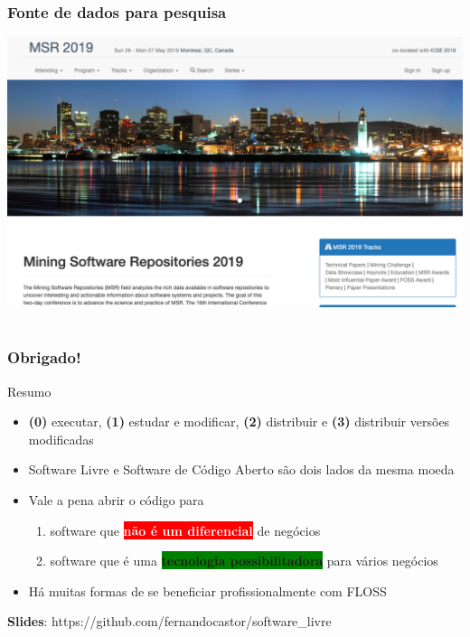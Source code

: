 \documentclass[xcolor=dvipsnames]{beamer}
\newcommand{\bred}[1]{\colorbox{red}{\textcolor{white}{#1}}}
\newcommand{\bgreen}[1]{\colorbox{green}{#1}}
\begin{document}
\begin{frame}
	\frametitle{Fonte de dados para pesquisa}
 	\includegraphics[scale=0.24]{msr.png}
\end{frame}


\section{}

\begin{frame}
	\frametitle{Obrigado!}
\begin{block}{Resumo}
\begin{itemize}
\item {\bf (0)} executar, {\bf (1)} estudar e modificar, {\bf (2)} distribuir e {\bf (3)} distribuir versões modificadas
\item Software Livre e Software de Código Aberto são dois lados da mesma moeda 
\item Vale a pena abrir o código para\vspace{0.1cm}
	\begin{enumerate}
	\item software que \bred{\textbf{não é um diferencial}} de negócios
	\item software que é uma \bgreen{\textbf{tecnologia possibilitadora}} para vários negócios
	\end{enumerate}
\item Há muitas formas de se beneficiar profissionalmente com FLOSS
\end{itemize}
\end{block}
\textbf{Slides}: https://github.com/fernandocastor/software\_livre

\end{frame}
\end{document}
